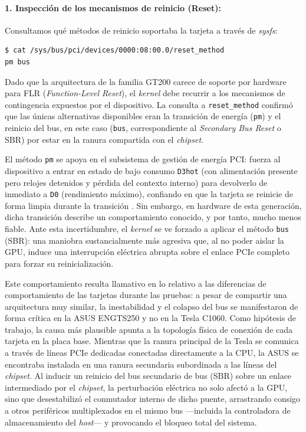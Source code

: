 \paragraph{1. Inspección de los mecanismos de reinicio (Reset):}
Consultamos qué métodos de reinicio soportaba la tarjeta a través de \textit{sysfs}:
\begin{lstlisting}[language=bash]
$ cat /sys/bus/pci/devices/0000:08:00.0/reset_method
pm bus
\end{lstlisting}

Dado que la arquitectura de la familia GT200 carece de soporte por hardware para 
FLR (\textit{Function-Level Reset}), el \textit{kernel} debe recurrir a los mecanismos 
de contingencia expuestos por el dispositivo. La consulta a \texttt{reset\_method} confirmó 
que las únicas alternativas disponibles eran la transición de energía (\texttt{pm}) y el 
reinicio del bus, en este caso (\texttt{bus}, correspondiente al \textit{Secondary Bus Reset} o SBR) por estar
en la ranura compartida con el \textit{chipset}.

El método \texttt{pm} se apoya en el subsistema de gestión de energía PCI: fuerza al dispositivo 
a entrar en estado de bajo consumo \texttt{D3hot} (con alimentación presente pero relojes detenidos 
y pérdida del contexto interno) para devolverlo de inmediato a \texttt{D0} (rendimiento máximo), confiando en que la 
tarjeta se reinicie de forma limpia durante la transición \cite{kernel_pci_pm}. Sin embargo, 
en hardware de esta generación, dicha transición describe un comportamiento conocido, y por tanto,
mucho menos fiable. Ante esta incertidumbre, el \textit{kernel} 
se ve forzado a aplicar el método \texttt{bus} (SBR): una maniobra sustancialmente más agresiva que, 
al no poder aislar la GPU, induce una interrupción eléctrica abrupta sobre el 
enlace PCIe completo para forzar su reinicialización.

Este comportamiento resulta llamativo en lo relativo a las diferencias de comportamiento de las tarjetas durante las pruebas: 
a pesar de compartir una arquitectura muy similar, la inestabilidad y el colapso del bus se 
manifestaron de forma crítica en la ASUS ENGTS250 y no en la Tesla C1060. Como hipótesis de 
trabajo, la causa más plausible apunta a la topología física de conexión de cada tarjeta en 
la placa base. Mientras que la ranura principal de la Tesla se comunica a través de líneas 
PCIe dedicadas conectadas directamente a la CPU, la ASUS se encontraba instalada en una 
ranura secundaria subordinada a las líneas del \textit{chipset}. Al inducir un reinicio del bus secundario 
de bus (SBR) sobre un enlace intermediado por el \textit{chipset}, la perturbación eléctrica no 
solo afectó a la GPU, sino que desestabilizó el conmutador interno de dicho puente, arrastrando 
consigo a otros periféricos multiplexados en el mismo bus ---incluida la controladora de 
almacenamiento del \textit{host}--- y provocando el bloqueo total del sistema.

